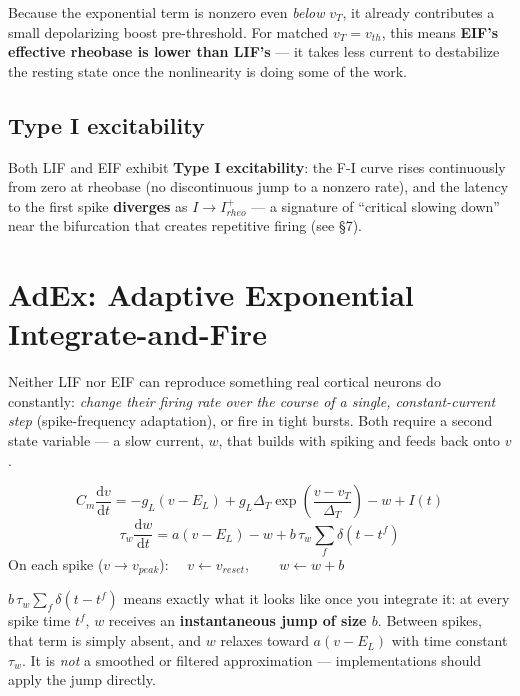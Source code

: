 \documentclass[11pt,a4paper]{article}
\newcommand{\dd}{\mathrm{d}}
\begin{document}
\begin{keybox}
Because the exponential term is nonzero even \emph{below} $v_T$, it already contributes a small depolarizing boost pre-threshold. For matched $v_T = v_{th}$, this means \textbf{EIF's effective rheobase is lower than LIF's} — it takes less current to destabilize the resting state once the nonlinearity is doing some of the work.
\end{keybox}

\subsection{Type I excitability}
Both LIF and EIF exhibit \textbf{Type I excitability}: the F-I curve rises continuously from zero at rheobase (no discontinuous jump to a nonzero rate), and the latency to the first spike \textbf{diverges} as $I \to I_{rheo}^+$ — a signature of ``critical slowing down'' near the bifurcation that creates repetitive firing (see \S7).

\section{AdEx: Adaptive Exponential Integrate-and-Fire}
Neither LIF nor EIF can reproduce something real cortical neurons do constantly: \emph{change their firing rate over the course of a single, constant-current step} (spike-frequency adaptation), or fire in tight bursts. Both require a second state variable — a slow current, $w$, that builds with spiking and feeds back onto $v$.

\begin{eqbox}
$$C_m \frac{\dd v}{\dd t} = -g_L(v - E_L) + g_L \Delta_T \exp\!\left(\frac{v - v_T}{\Delta_T}\right) - w + I(t)$$
$$\tau_w \frac{\dd w}{\dd t} = a(v - E_L) - w + b\,\tau_w \sum_f \delta(t - t^f)$$
On each spike ($v \to v_{peak}$): $\quad v \leftarrow v_{reset}, \qquad w \leftarrow w + b$
\end{eqbox}

\begin{defbox}
$b\,\tau_w\sum_f \delta(t-t^f)$ means exactly what it looks like once you integrate it: at every spike time $t^f$, $w$ receives an \textbf{instantaneous jump of size $b$}. Between spikes, that term is simply absent, and $w$ relaxes toward $a(v - E_L)$ with time constant $\tau_w$. It is \emph{not} a smoothed or filtered approximation — implementations should apply the jump directly.
\end{defbox}
\end{document}
